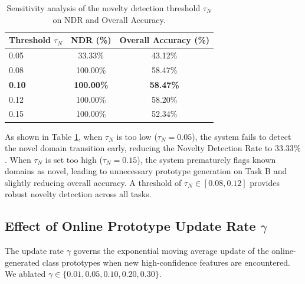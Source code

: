 \documentclass{article}
\theoremstyle{plain}
\theoremstyle{definition}
\theoremstyle{remark}
\begin{document}
\begin{table}[ht]
\caption{Sensitivity analysis of the novelty detection threshold $\tau_N$ on NDR and Overall Accuracy.}
\label{table:threshold_sensitivity}
\vskip 0.15in
\begin{center}
\begin{small}
\begin{sc}
\begin{tabular}{lcc}
\toprule
Threshold $\tau_N$ & NDR (\%) & Overall Accuracy (\%) \\
\midrule
0.05 & 33.33\% & 43.12\% \\
0.08 & 100.00\% & 58.47\% \\
\textbf{0.10} & \textbf{100.00\%} & \textbf{58.47\%} \\
0.12 & 100.00\% & 58.20\% \\
0.15 & 100.00\% & 52.34\% \\
\bottomrule
\end{tabular}
\end{sc}
\end{small}
\end{center}
\vskip -0.1in
\end{table}

As shown in Table \ref{table:threshold_sensitivity}, when $\tau_N$ is too low ($\tau_N = 0.05$), the system fails to detect the novel domain transition early, reducing the Novelty Detection Rate to $33.33\%$. When $\tau_N$ is set too high ($\tau_N = 0.15$), the system prematurely flags known domains as novel, leading to unnecessary prototype generation on Task B and slightly reducing overall accuracy. A threshold of $\tau_N \in [0.08, 0.12]$ provides robust novelty detection across all tasks.

\subsection{Effect of Online Prototype Update Rate $\gamma$}
The update rate $\gamma$ governs the exponential moving average update of the online-generated class prototypes when new high-confidence features are encountered. We ablated $\gamma \in \{0.01, 0.05, 0.10, 0.20, 0.30\}$.
\end{document}
